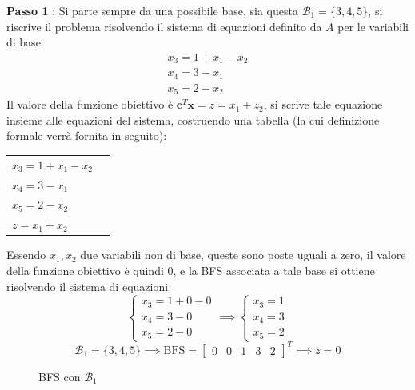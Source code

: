 \documentclass[10pt, letterpaper]{report}
\begin{document}
\textbf{Passo 1} : Si parte sempre da una possibile base, sia questa $\mathcal B_1 = \{3,4,5\}$, si riscrive il problema risolvendo il sistema di equazioni definito da $A$ per le variabili di base 
\begin{eqnarray*}
    x_3=1+x_1-x_2\\ 
    x_4=3-x_1\\ 
    x_5=2-x_2
\end{eqnarray*}
Il valore della funzione obiettivo è $\mathbf c ^T \mathbf x=z=x_1+z_2$, si scrive tale equazione insieme alle equazioni del sistema, costruendo una tabella (la cui definizione formale verrà fornita in seguito):
\begin{center}
    \begin{tabular}{|l|l|}\hline 
        $x_3=1+x_1-x_2$\\ 
        $x_4=3-x_1$\\ 
        $x_5=2-x_2$ \\
        \hline 
        $z=x_1+x_2$ \\\hline 
    \end{tabular}
\end{center}
Essendo $x_1,x_2$ due variabili non di base, queste sono poste uguali a zero, il valore della funzione obiettivo è quindi 0, e la BFS associata a tale base si ottiene risolvendo il sistema di equazioni
$$\begin{cases}
    x_3=1+0-0\\ 
    x_4=3-0\\ 
    x_5=2-0
\end{cases}\implies\begin{cases}
    x_3=1\\ x_4=3\\ x_5=2
\end{cases}$$
$$ \mathcal{B}_1 = \{3,4,5\}\implies \text{BFS}=\begin{bmatrix}
    0 & 0 & 1 & 3 & 2 
\end{bmatrix}^T \implies z = 0$$
\begin{figure}[h]
    \caption{BFS con $\mathcal B_1$}
\end{figure}
\end{document}
